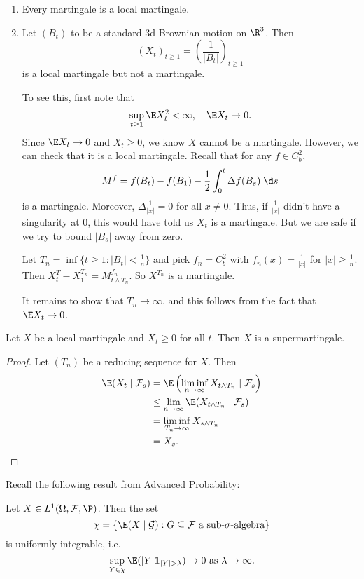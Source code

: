\documentclass[a4paper]{article}
\begin{document}
\begin{eg}\leavevmode
  \begin{enumerate}
    \item Every martingale is a local martingale.
    \item Let $(B_t)$ to be a standard 3d Brownian motion on $\R^3$. Then
      \[
        (X_t)_{t \geq 1} = \left(\frac{1}{|B_t|}\right)_{t \geq 1}
      \]
      is a local martingale but not a martingale.

      To see this, first note that
      \[
        \sup_{t \geq 1} \E X_t^2 < \infty,\quad \E X_t \to 0.
      \]
      Since $\E X_t \to 0$ and $X_t \geq 0$, we know $X$ cannot be a martingale. However, we can check that it is a local martingale. Recall that for any $f \in C^2_b$,
      \[
        M^f = f(B_t) - f(B_1) - \frac{1}{2} \int_0^t \Delta f(B_s)\;\d s
      \]
      is a martingale. Moreover, $\Delta \frac{1}{|x|} = 0$ for all $x \not= 0$. Thus, if $\frac{1}{|x|}$ didn't have a singularity at $0$, this would have told us $X_t$ is a martingale. But we are safe if we try to bound $|B_s|$ away from zero.

      Let $T_n = \inf \{t \geq 1: |B_t| < \frac{1}{n}\}$ and pick $f_n = C_b^2$ with $f_n(x) = \frac{1}{|x|}$ for $|x| \geq \frac{1}{n}$. Then $X_t^T - X_1^{T_n} = M^{f_n}_{t \wedge T_n}$. So $X^{T_n}$ is a martingale.

      It remains to show that $T_n \to \infty$, and this follows from the fact that $\E X_t \to 0$.
  \end{enumerate}
\end{eg}

\begin{prop}
  Let $X$ be a local martingale and $X_t \geq 0$ for all $t$. Then $X$ is a supermartingale.
\end{prop}

\begin{proof}
  Let $(T_n)$ be a reducing sequence for $X$. Then
  \begin{align*}
    \E(X_t \mid \mathcal{F}_s) &= \E \left(\liminf_{n \to \infty} X_{t \wedge T_n} \mid \mathcal{F}_s\right) \\
    &\leq \lim_{n \to \infty} \E(X_{t \wedge T_n} \mid \mathcal{F}_s) \\
    &= \liminf_{T_n \to \infty} X_{s \wedge T_n} \\
    &= X_s.\qedhere
  \end{align*}
\end{proof}

Recall the following result from Advanced Probability:
\begin{prop}
  Let $X \in L^1 (\Omega, \mathcal{F}, \P)$. Then the set
  \[
    \chi = \{\E(X \mid \mathcal{G}): G \subseteq \mathcal{F}\text{ a sub-$\sigma$-algebra}\}
  \]
  is uniformly integrable, i.e.
  \[
    \sup_{Y \in \chi} \E (|Y| \mathbf{1}_{|Y| > \lambda}) \to 0\text{ as } \lambda \to \infty.
  \]
\end{prop}
\end{document}
